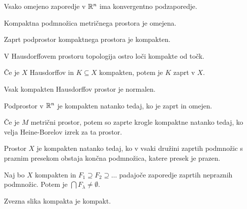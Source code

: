 \begin{izrek}
    Vsako omejeno zaporedje v $\mathbb{R}^n$ ima konvergentno podzaporedje.
\end{izrek}

\begin{trditev}
    Kompaktna podmnožica metričnega prostora je omejena.
\end{trditev}

\begin{trditev}
    Zaprt podprostor kompaktnega prostora je kompakten.
\end{trditev}

\begin{trditev}
    V Hausdorffovem prostoru topologija ostro loči kompakte od točk.
\end{trditev}

\begin{trditev}
    Če je $X$ Hausdorffov in $K \subseteq X$ kompakten, potem je $K$ zaprt v $X$.
\end{trditev}

\begin{posledica}
    Vsak kompakten Hausdorffov prostor je normalen.
\end{posledica}

\begin{izrek}
    Podprostor v $\mathbb{R}^n$ je kompakten natanko tedaj, ko je zaprt in omejen.
\end{izrek}

\begin{opomba}
    Če je \(M\) metrični prostor, potem so zaprte krogle kompaktne natanko tedaj, ko velja Heine-Borelov izrek za ta prostor.
\end{opomba}

\begin{trditev}
    Prostor $X$ je kompakten natanko tedaj, ko v vsaki družini zaprtih podmnožic s praznim presekom obstaja končna podmnožica, katere presek je prazen.
\end{trditev}

\begin{izrek}
    Naj bo $X$ kompakten in $F_1 \supseteq F_2 \supseteq \ldots$ padajoče zaporedje zaprtih nepraznih podmnožic. Potem je $\bigcap F_\lambda \neq \emptyset$.
\end{izrek}

\newpage
\begin{izrek}
    Zvezna slika kompakta je kompakt.
\end{izrek}

